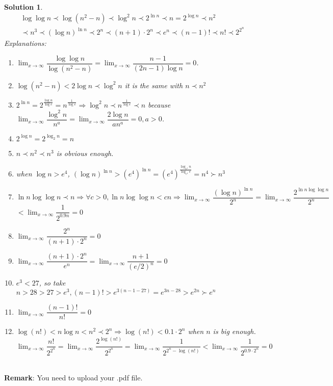 \documentclass{article}
\newtheorem*{solution}{Solution}
\begin{document}
\begin{enumerate}
~\\
\begin{solution}
  $$\begin{array}{l}\log\log n\prec \log (n^2-n) \prec \log^2 n \prec 2^{\ln n} \prec n = 2^{\log n} \prec n^2\\
  \prec n^3 \prec (\log n)^{\ln n} \prec 2^n \prec (n+1)\cdot 2^n\prec e^n \prec (n-1)! \prec n! \prec 2^{2^n}
  \end{array}$$
Explanations:
\begin{enumerate}
  \item $\lim_{x\rightarrow\infty}\dfrac{\log\log n}{\log(n^2-n)}=\lim_{x\rightarrow\infty}\dfrac{n-1}{(2n-1)\log n}=0$.
  \item $\log(n^2-n)<2\log n\prec \log^2 n$ it is the same with $n \prec n^2$
  \item $2^{\ln n}=2^\frac{\log n}{\log e}= n^{\frac{1}{\log e}}\Rightarrow \log^2 n\prec n^\frac{1}{\log e}\prec n$ because $\lim_{x\rightarrow\infty}\dfrac{\log^2 n}{n^a}=\lim_{x\rightarrow\infty}\dfrac{2\log n}{an^a}=0, a>0$.
  \item $2^{\log n}=2^{\log_2 n} = n$
  \item $n\prec n^2\prec n^3$ is obvious enough.
  \item when $\log n > e^4$, $(\log n)^{\ln n}>(e^4)^{\ln n}=(e^4)^{\frac{\log_{e^4} n}{\log_{e^4} e}}=n^4\succ n^3$
  \item $\ln n\log\log n \prec n \Rightarrow \forall c>0, \ln n\log\log n < c n\Rightarrow \lim_{x\rightarrow\infty}\dfrac{(\log n)^{\ln n}}{2^n}=\lim_{x\rightarrow\infty}\dfrac{2^{\ln n\log\log n}}{2^n}$\\$<\lim_{x\rightarrow\infty}\dfrac{1}{2^{0.9n}}=0$
  \item $\lim_{x\rightarrow\infty}\dfrac{2^n}{(n+1)\cdot2^n}=0$
  \item $\lim_{x\rightarrow\infty}\dfrac{(n+1)\cdot2^n}{e^n}=\lim_{x\rightarrow\infty}\dfrac{n+1}{(e/2)^n}=0$
  \item $e^3<27$, so take $n > 28 > 27 > e^3, (n-1)! > e^{3(n-1-27)} = e^{3n-28}> e^{2n} \succ e^n$
  \item $\lim_{x\rightarrow\infty}\dfrac{(n-1)!}{n!}=0$
  \item $\log (n!) < n\log n < n^2 \prec 2^n \Rightarrow \log(n!) < 0.1\cdot 2^n$ when $n$ is big enough.\\
        $\lim_{x\rightarrow\infty}\dfrac{n!}{2^{2^n}}=\lim_{x\rightarrow\infty}\dfrac{2^{\log(n!)}}{2^{2^n}}=\lim_{x\rightarrow\infty}\dfrac{1}{2^{2^n-\log(n!)}}<\lim_{x\rightarrow\infty}\dfrac{1}{2^{0.9\cdot 2^n}}=0$
\end{enumerate}
\end{solution}
~\\


\textbf{Remark}: You need to upload your .pdf file.
\end{enumerate}
\end{document}
